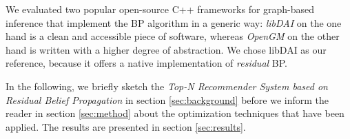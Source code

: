 We evaluated two popular open-source C++ frameworks for graph-based inference that implement the BP algorithm in a generic way: \textit{libDAI} \cite{Mooij_libDAI_10} on the one hand is a clean and accessible piece of software, whereas \textit{OpenGM} \cite{andres2012opengm} on the other hand is written with a higher degree of abstraction. We chose libDAI as our reference, because it offers a native implementation of \textit{residual} BP. 

In the following, we briefly sketch the \textit{Top-N Recommender System based on Residual Belief Propagation} in section \ref{sec:background} before we inform the reader in section \ref{sec:method} about the optimization techniques that have been applied. The results are presented in section \ref{sec:results}.

